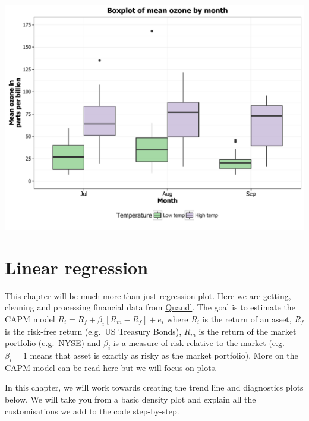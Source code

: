 \documentclass[]{article}
\begin{document}
\begin{center}\includegraphics{0_all_posts_pdf/box_18-1} \end{center}

\section{Linear regression}\label{linear-regression}

This chapter will be much more than just regression plot. Here we are
getting, cleaning and processing financial data from
\href{https://www.quandl.com/}{Quandl}. The goal is to estimate the CAPM
model \(R_i = R_f + \beta_i [R_m - R_f] + e_i\) where \(R_i\) is the
return of an asset, \(R_f\) is the risk-free return (e.g.~US Treasury
Bonds), \(R_m\) is the return of the market portfolio (e.g.~NYSE) and
\(\beta_i\) is a measure of risk relative to the market (e.g.
\(\beta_i = 1\) means that asset is exactly as risky as the market
portfolio). More on the CAPM model can be read
\href{http://people.stern.nyu.edu/ashapiro/courses/B01.231103/FFL09.pdf}{here}
but we will focus on plots.

In this chapter, we will work towards creating the trend line and
diagnostics plots below. We will take you from a basic density plot and
explain all the customisations we add to the code step-by-step.
\end{document}
